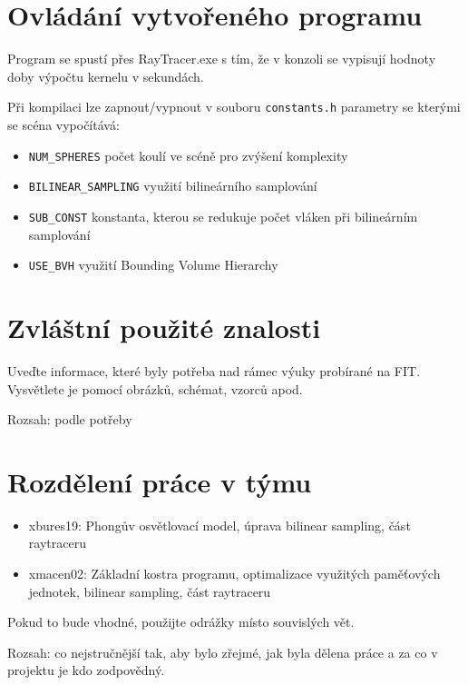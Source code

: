 \documentclass[12pt,a4paper,titlepage,final]{report}
\begin{document}
\section{Ovládání vytvořeného programu}

Program se spustí přes RayTracer.exe s tím, že v konzoli se vypisují hodnoty doby výpočtu kernelu v sekundách.

Při kompilaci lze zapnout/vypnout v souboru \verb|constants.h| parametry se kterými se scéna vypočítává:
\begin{itemize}
	\item \verb|NUM_SPHERES| počet koulí ve scéně pro zvýšení komplexity
	\item \verb|BILINEAR_SAMPLING| využití bilineárního samplování
	\item \verb|SUB_CONST| konstanta, kterou se redukuje počet vláken při bilineárním samplování
	\item \verb|USE_BVH| využití Bounding Volume Hierarchy
\end{itemize}

\section{Zvláštní použité znalosti}

Uveďte informace, které byly potřeba nad rámec výuky probírané na FIT.
Vysvětlete je pomocí obrázků, schémat, vzorců apod. 

Rozsah: podle potřeby 

\section{Rozdělení práce v týmu}

\begin{itemize}
\item xbures19: Phongův osvětlovací model, úprava bilinear sampling, část raytraceru 
\item xmacen02: Základní kostra programu, optimalizace využitých paměťových jednotek, bilinear sampling, část raytraceru 
\end{itemize}
Pokud to bude vhodné, použijte odrážky místo souvislých vět.

Rozsah: co nejstručnější tak, aby bylo zřejmé, jak byla dělena práce a za co v
projektu je kdo zodpovědný.
\end{document}
